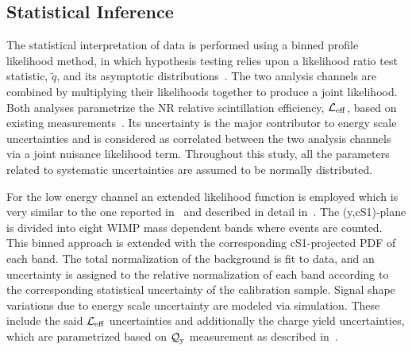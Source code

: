 
\subsection{Statistical Inference}
\label{sec:LikelihoodFunction}
The statistical interpretation of data is performed using a binned profile likelihood method, in which hypothesis testing relies upon a likelihood ratio test statistic, $\tilde{q}$, 
and its asymptotic distributions~\cite{asympt}. The two analysis channels are combined by multiplying their likelihoods together to produce a joint likelihood. 
Both analyses parametrize the NR relative scintillation efficiency, $\mathcal{L}_{\mathrm{eff}}$, based on existing measurements~\cite{run8Result}. Its uncertainty is the major contributor to energy scale uncertainties and is considered as correlated between the two analysis channels via a joint nuisance likelihood term.
Throughout this study, all the parameters related to systematic uncertainties are assumed to be normally distributed.

For the low energy channel an extended likelihood function is employed which is very similar to the one reported in~\cite{Aprile:2011hx} and described in detail in~\cite{xe100_run_combination}. 
The (y,cS1)-plane is divided into eight WIMP mass dependent bands where events are counted. This binned approach is extended with the corresponding cS1-projected PDF of each band. The total normalization of the background is fit to data, and an uncertainty is assigned to the relative normalization of each band according to the corresponding statistical uncertainty of the calibration sample.
Signal shape variations due to energy scale uncertainty are modeled via simulation. These include  the said $\mathcal{L}_{\mathrm{eff}}$ uncertainties and additionally 
the charge yield uncertainties, which are parametrized based on $\mathcal{Q}_{\mathrm{y}}$ measurement as described in~\cite{DataMCXenon}.

